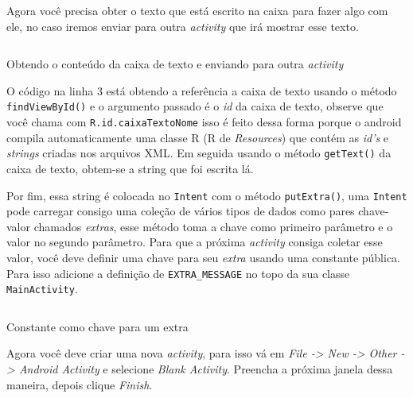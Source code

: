 \documentclass[a4paper,12pt,brazil,doubleside]{book}
\begin{document}
\begin{singlespace}
Agora você precisa obter o texto que está escrito na caixa para fazer algo com ele, no caso iremos enviar para outra \emph{activity} que irá mostrar esse texto.

\begin{listing}[H]
\inputminted[linenos=true,fontsize=\small,frame=lines, framesep=2mm, tabsize=2,numbersep=5pt]{java}{src/firstapp/6.java}
\caption{Obtendo o conteúdo da caixa de texto e enviando para outra \emph{activity}}
\end{listing}

O código na linha 3 está obtendo a referência a caixa de texto usando o método \texttt{findViewById()} e o argumento passado é o \textit{id} da caixa de texto, observe que você chama com \texttt{R.id.caixaTextoNome} isso é feito dessa forma porque o android compila automaticamente uma classe R (R de \textit{Resources}) que contém as \textit{id's} e \textit{strings} criadas nos arquivos XML.
Em seguida usando o método \texttt{getText()} da caixa de texto, obtem-se a string que foi escrita lá.

Por fim, essa string é colocada no \texttt{Intent} com o método \texttt{putExtra()}, uma \texttt{Intent} pode carregar consigo uma coleção de vários tipos de dados como pares chave-valor chamados \textit{extras}, esse método toma a chave como primeiro parâmetro e o valor no segundo parâmetro.
Para que a próxima \emph{activity} consiga coletar esse valor, você deve definir uma chave para seu \textit{extra} usando uma constante pública. Para isso adicione a definição de \texttt{EXTRA\_MESSAGE} no topo da sua classe \texttt{MainActivity}.

\begin{listing}[H]
\inputminted[linenos=true,fontsize=\small,frame=lines, framesep=2mm, tabsize=2,numbersep=5pt]{java}{src/firstapp/7.java}
\caption{Constante como chave para um extra}
\end{listing}

Agora você deve criar uma nova \emph{activity}, para isso vá em \textit{File -> New -> Other -> Android Activity} e selecione \textit{Blank Activity}. Preencha a próxima janela dessa maneira, depois clique \textit{Finish}. 


\end{singlespace}
\end{document}

